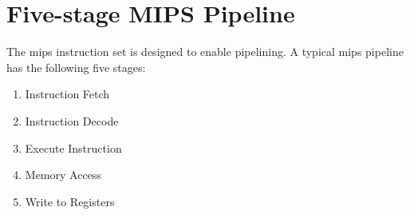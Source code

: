 \section{Five-stage MIPS Pipeline}
The \gls{mips} instruction set is designed to enable pipelining.
A typical \gls{mips} pipeline has the following five stages:
\begin{enumerate}
\item Instruction Fetch
\item Instruction Decode
\item Execute Instruction
\item Memory Access
\item Write to Registers
\end{enumerate}

